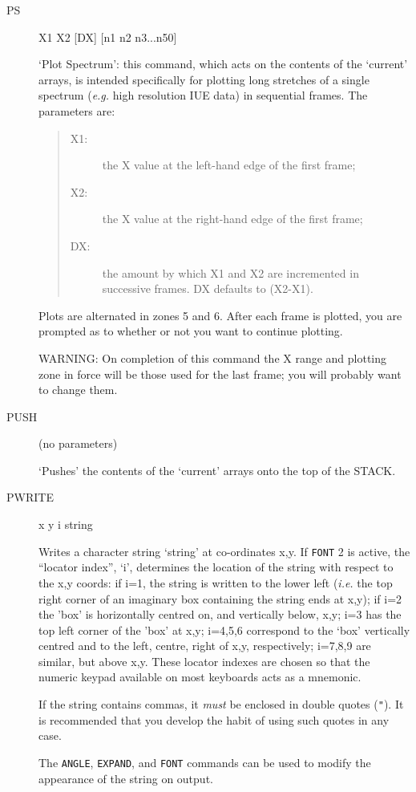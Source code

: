 \documentclass[twoside,11pt]{article}
\newcommand{\htmlref}[2]{#1}
\newcommand{\xlabel}[1]{}
\renewcommand{\_}{\texttt{\symbol{95}}}
\newcommand{\dipcom}[3] { \item [{#1}] {#2} \par }
\newenvironment{dipdesc}{\begin{description}}{\end{description}}
\newcommand{\dipitem}[2]{ \item[{#1}] {#2} }
\newcommand{\dipcom}[3] { \end{description}
                            \subsection{\xlabel{#1}{#1} - {#3}}
                            \label{COM:#1}
                            \begin{description}
                            \item [Syntax:] {\tt{#1} {#2}}
                            \par
                            \item [Description:]}
\newenvironment{dipdesc}{\begin{itemize}}{\end{itemize}}
\newcommand{\dipitem}[2]{ \item {\bf{#1}} {#2} }
\begin{document}
\begin {description}
\dipcom{PS}{X1 X2 [DX] [n1 n2 n3...n50]}{Plots long stretches from a single spectrum}
`Plot Spectrum': this command, which acts on the contents of the
`current' arrays, is intended specifically for plotting long stretches
of a single spectrum ({\em e.g.} high resolution IUE data) in
sequential frames. The parameters are:

\begin{quote}
\begin{dipdesc}
\dipitem {X1:}{ the X value at the left-hand edge of the first frame;}
\dipitem {X2:}{ the X value at the right-hand edge of the first frame;}
\dipitem {DX:}{ the amount by which X1 and X2 are incremented in
successive frames. DX defaults to (X2-X1).}
\end{dipdesc}
\end{quote}

Plots are alternated in zones 5 and 6. After each frame is plotted,
you are prompted as to whether or not you want to continue plotting.

WARNING: On completion of this command the X range and plotting zone
in force will be those used for the last frame; you will probably want
to change them.

\dipcom{PUSH}{(no parameters)}{Pushes the current arrays onto the stack}
`Pushes' the contents of the `current' arrays onto the top of the STACK.

\dipcom{PWRITE}{x y i string}{Writes a character string at given co-ordinates}
Writes a character string `string' at co-ordinates x,y. If \htmlref{{\tt{FONT}}}{COM:FONT}  2 is
active, the ``locator index'', `i', determines the location of the
string with respect to the x,y coords: if i=1, the string is written
to the lower left ({\em i.e.} the top right corner of an imaginary
box containing the string ends at x,y); if i=2 the 'box' is
horizontally centred on, and vertically below, x,y; i=3 has the top
left corner of the 'box' at x,y; i=4,5,6 correspond to the `box'
vertically centred and to the left, centre, right of x,y,
respectively; i=7,8,9 are similar, but above x,y. These locator
indexes are chosen so that the numeric keypad available on most
keyboards acts as a mnemonic.

If the string contains commas, it {\em must} be enclosed in double
quotes ({\tt{"}}).  It is recommended that you develop the habit of
using such quotes in any case.

The \htmlref{{\tt{ANGLE}}}{COM:ANGLE},  \htmlref{{\tt{EXPAND}}}{COM:EXPAND},  and \htmlref{{\tt{FONT}}}{COM:FONT}  commands can be used to modify the
appearance of the string on output.


\end{description}
\end{document}
